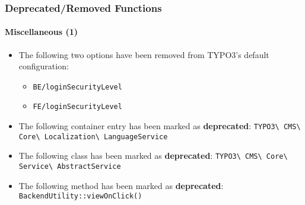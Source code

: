 %

\begin{frame}[fragile]
	\frametitle{Deprecated/Removed Functions}
	\framesubtitle{Miscellaneous (1)}

	\begin{itemize}
		\item The following two options have been removed from TYPO3's default
			configuration:
			\begin{itemize}
				\item \texttt{BE/loginSecurityLevel}
				\item \texttt{FE/loginSecurityLevel}
			\end{itemize}

		\item The following container entry has been marked as
			\textbf{deprecated}:\newline
			\small\texttt{TYPO3\textbackslash
				CMS\textbackslash
				Core\textbackslash
				Localization\textbackslash
				LanguageService}\normalsize

		\item The following class has been marked as \textbf{deprecated}:\newline
			\texttt{TYPO3\textbackslash
				CMS\textbackslash
				Core\textbackslash
				Service\textbackslash
				AbstractService}

		\item The following method has been marked as \textbf{deprecated}:\newline
			\texttt{BackendUtility::viewOnClick()}

	\end{itemize}

\end{frame}

